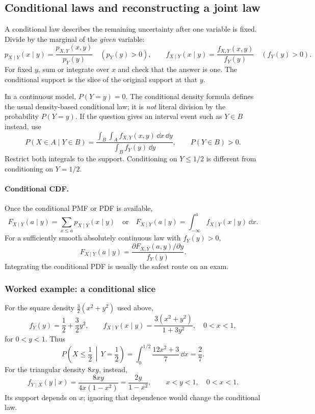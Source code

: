 \subsection{Conditional laws and reconstructing a joint law}

A conditional law describes the remaining uncertainty after one variable is fixed. Divide by the marginal of the \emph{given} variable:
\[
\boxed{p_{X\mid Y}(x\mid y)=\frac{p_{X,Y}(x,y)}{p_Y(y)}}\quad(p_Y(y)>0),
\qquad
\boxed{f_{X\mid Y}(x\mid y)=\frac{f_{X,Y}(x,y)}{f_Y(y)}}\quad(f_Y(y)>0).
\]
For fixed $y$, sum or integrate over $x$ and check that the answer is one. The conditional support is the slice of the original support at that $y$.

In a continuous model, $P(Y=y)=0$. The conditional density formula defines the usual density-based conditional law; it is \emph{not} literal division by the probability $P(Y=y)$. If the question gives an interval event such as $Y\in B$ instead, use
\[
 P(X\in A\mid Y\in B)
 =\frac{\displaystyle\int_B\int_A f_{X,Y}(x,y)\,\dd x\,\dd y}
 {\displaystyle\int_B f_Y(y)\,\dd y},
 \qquad P(Y\in B)>0.
\]
Restrict both integrals to the support. Conditioning on $Y\leq1/2$ is different from conditioning on $Y=1/2$.

\paragraph{Conditional CDF.} Once the conditional PMF or PDF is available,
\[
 F_{X\mid Y}(a\mid y)=\sum_{x\leq a}p_{X\mid Y}(x\mid y)
 \quad\text{or}\quad
 F_{X\mid Y}(a\mid y)=\int_{-\infty}^{a}f_{X\mid Y}(x\mid y)\,\dd x.
\]
For a sufficiently smooth absolutely continuous law with $f_Y(y)>0$,
\[
 F_{X\mid Y}(a\mid y)
 =\frac{\partial F_{X,Y}(a,y)/\partial y}{f_Y(y)}.
\]
Integrating the conditional PDF is usually the safest route on an exam.

\subsubsection*{Worked example: a conditional slice}
For the square density $\tfrac32(x^2+y^2)$ used above,
\[
 f_Y(y)=\frac12+\frac32y^2,
 \qquad
 f_{X\mid Y}(x\mid y)=\frac{3(x^2+y^2)}{1+3y^2},\quad0<x<1,
\]
for $0<y<1$. Thus
\[
 P\left(X\leq\frac12\,\middle|\,Y=\frac12\right)
 =\int_0^{1/2}\frac{12x^2+3}{7}\,\dd x=\frac27.
\]
For the triangular density $8xy$, instead,
\[
 f_{Y\mid X}(y\mid x)=\frac{8xy}{4x(1-x^2)}
 =\frac{2y}{1-x^2},\qquad x<y<1,\quad0<x<1.
\]
Its support depends on $x$; ignoring that dependence would change the conditional law.

